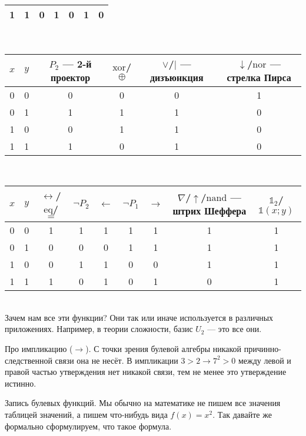 \documentclass{article}
\begin{document}
\begin{itemize}
\begin{Comment}
\begin{tabular}{|cc|ccccc|}
                1 & 1 & 0 & 1 & 0 & 1 & 0\\
                \hline
            \end{tabular}\\
            \begin{tabular}{|cc|cccc|}
                \hline
                $x$ & $y$ & $P_2$ --- 2-й проектор & $\mathrm{xor}$/$\oplus$ & $\lor$/$|$ --- дизъюнкция & $\downarrow$/$\mathrm{nor}$ --- стрелка Пирса\\
                \hline
                0 & 0 & 0 & 0 & 0 & 1\\
                0 & 1 & 1 & 1 & 1 & 0\\
                1 & 0 & 0 & 1 & 1 & 0\\
                1 & 1 & 1 & 0 & 1 & 0\\
                \hline
            \end{tabular}\\
            \begin{tabular}{|cc|ccccccc|}
                \hline
                $x$ & $y$ & $\leftrightarrow$/$\mathrm{eq}$/$=$ & $\neg P_2$ & $\leftarrow$ & $\neg P_1$ & $\rightarrow$ & $\nabla$/$\uparrow$/$\mathrm{nand}$ --- штрих Шеффера & $\mathbb1_2$/$\mathbb1(x;y)$\\
                \hline
                0 & 0 & 1 & 1 & 1 & 1 & 1 & 1 & 1\\
                0 & 1 & 0 & 0 & 0 & 1 & 1 & 1 & 1\\
                1 & 0 & 0 & 1 & 1 & 0 & 0 & 1 & 1\\
                1 & 1 & 1 & 0 & 1 & 0 & 1 & 0 & 1\\
                \hline
            \end{tabular}\\
            Зачем нам все эти функции? Они так или иначе используется в различных приложениях. Например, в теории сложности, базис $U_2$ --- это все они.
        \end{Comment}
        \begin{Comment}
            Про импликацию ($\rightarrow$). С точки зрения булевой алгебры никакой причинно-следственной связи она не несёт. В импликации $3>2\rightarrow 7^2>0$ между левой и правой частью утверждения нет никакой связи, тем не менее это утверждение истинно.
        \end{Comment}
        \begin{Comment}
            Запись булевых функций. Мы обычно на математике не пишем все значения таблицей значений, а пишем что-нибудь вида $f(x)=x^2$. Так давайте же формально сформулируем, что такое формула.

\end{Comment}
\end{itemize}
\end{document}
